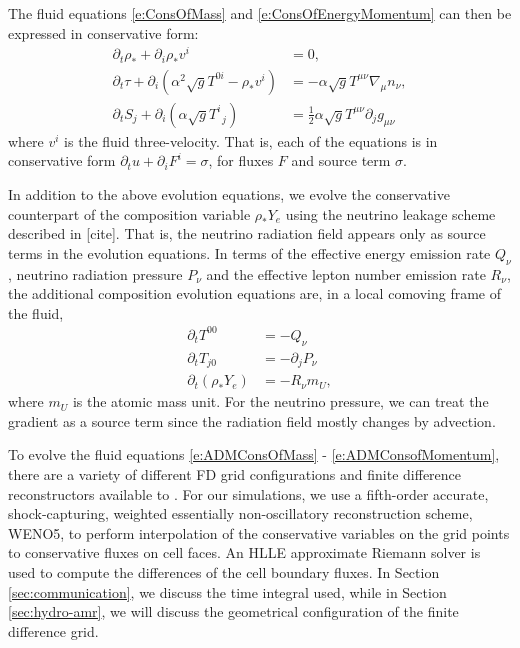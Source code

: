 The fluid equations \ref{e:ConsOfMass} and \ref{e:ConsOfEnergyMomentum} can then be expressed in conservative form:
\begin{align}
\label{e:ADMConsOfMass}
\partial_t \rho_* + \partial_i \rho_* v^i 
	&= 0, \\
\label{e:ADMConsOfEnergy}
\partial_t \tau + \partial_i \left(\alpha^2 \sqrt{g} T^{0 i} - \rho_*v^i\right) 
	&= -\alpha \sqrt{g} T^{\mu \nu} \nabla_\mu n_\nu, \\
\label{e:ADMConsofMomentum}
\partial_t S_j + \partial_i\left(\alpha \sqrt{g}T^i_{\,\,\,j}\right) 
	&= \frac{1}{2} \alpha \sqrt{g} T^{\mu \nu} \partial_j g_{\mu \nu}
\end{align}
where $v^i$ is the fluid three-velocity.  That is, each of the equations is in conservative form $\partial_t u  + \partial_i F^i = \sigma$, for  fluxes $F$ and  source term $\sigma$.  

In addition to the above evolution equations, we evolve the conservative counterpart of the composition variable $\rho_* Y_e$ using the neutrino leakage scheme described in [cite].  That is, the neutrino radiation field appears only as source terms in the evolution equations.  In terms of the effective energy emission rate $Q_\nu$, neutrino radiation pressure $P_\nu$ and the effective lepton number emission rate $R_\nu$, the additional composition evolution equations are, in a local comoving frame of the fluid, 
\begin{align}
\partial_t T^{00} &= -Q_\nu \\
\partial_t T_{j0} &= - \partial_j P_\nu \\
\partial_t (\rho_* Y_e) &= -R_\nu m_U ,
\end{align}
where $m_U$ is the atomic mass unit.  For the neutrino pressure, we can treat the gradient as a source term since the radiation field mostly changes by advection.

To evolve the fluid equations \ref{e:ADMConsOfMass} - \ref{e:ADMConsofMomentum}, there are a variety of different FD grid configurations and finite difference reconstructors available to \SpEC.  For our simulations, we use a fifth-order accurate, shock-capturing, weighted essentially non-oscillatory reconstruction scheme, WENO5, to perform interpolation of the conservative variables on the grid points to conservative fluxes on cell faces.  An HLLE approximate Riemann solver is used to compute the differences of the cell boundary fluxes.
In Section \ref{sec:communication}, we discuss the time integral used, while in Section \ref{sec:hydro-amr}, we will discuss the geometrical configuration of the finite difference grid.

